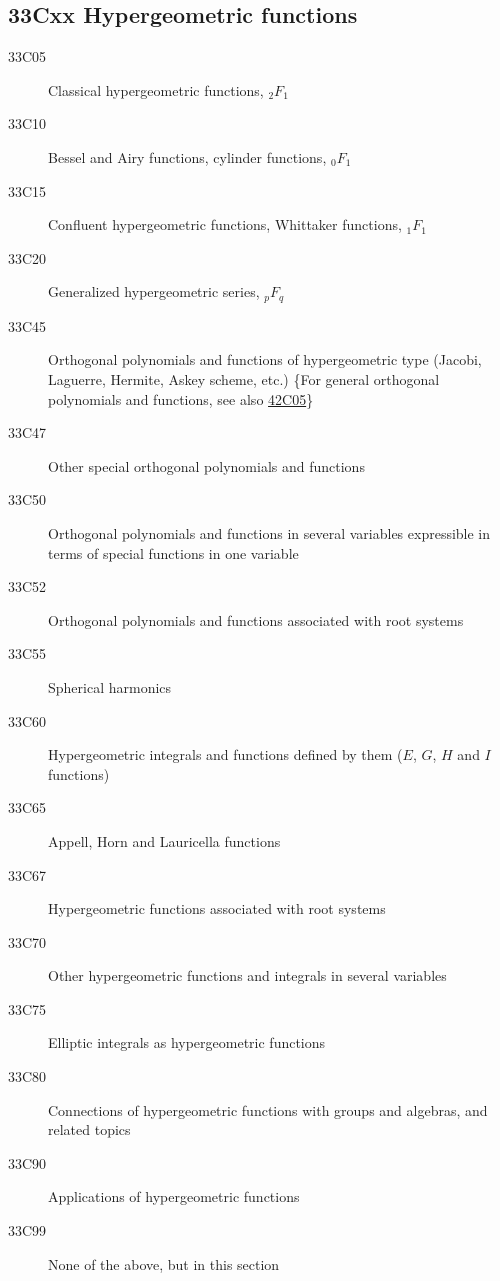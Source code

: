 \documentclass[letterpaper]{article}
\begin{document}
\subsection*{33Cxx  Hypergeometric functions }\label{33Cxx}
\begin{description}  
\item [33C05]\label{33C05} Classical hypergeometric functions, ${}_2F_1$
\item [33C10]\label{33C10} Bessel and Airy functions, cylinder functions, ${}_0F_1$
\item [33C15]\label{33C15} Confluent hypergeometric functions, Whittaker functions, ${}_1F_1$
\item [33C20]\label{33C20} Generalized hypergeometric series, ${}_pF_q$
\item [33C45]\label{33C45} Orthogonal polynomials and functions of hypergeometric type (Jacobi, Laguerre, Hermite, Askey scheme, etc.) \{For general orthogonal polynomials and functions, see also \hyperref[42C05]{42C05}\}
\item [33C47]\label{33C47} Other special orthogonal polynomials and functions
\item [33C50]\label{33C50} Orthogonal polynomials and functions in several variables expressible in terms of special functions in one variable
\item [33C52]\label{33C52} Orthogonal polynomials and functions associated with root systems
\item [33C55]\label{33C55} Spherical harmonics 
\item [33C60]\label{33C60} Hypergeometric integrals and functions defined by them ($E$, $G$, $H$ and $I$ functions)
\item [33C65]\label{33C65} Appell, Horn and Lauricella functions
\item [33C67]\label{33C67} Hypergeometric functions associated with root systems
\item [33C70]\label{33C70} Other hypergeometric functions and integrals in several variables
\item [33C75]\label{33C75} Elliptic integrals as hypergeometric functions
\item [33C80]\label{33C80}  Connections of hypergeometric functions with groups and algebras, and related topics
\item [33C90]\label{33C90} Applications of hypergeometric functions
\item [33C99]\label{33C99} None of the above, but in this section
\end{description}
\end{document}

